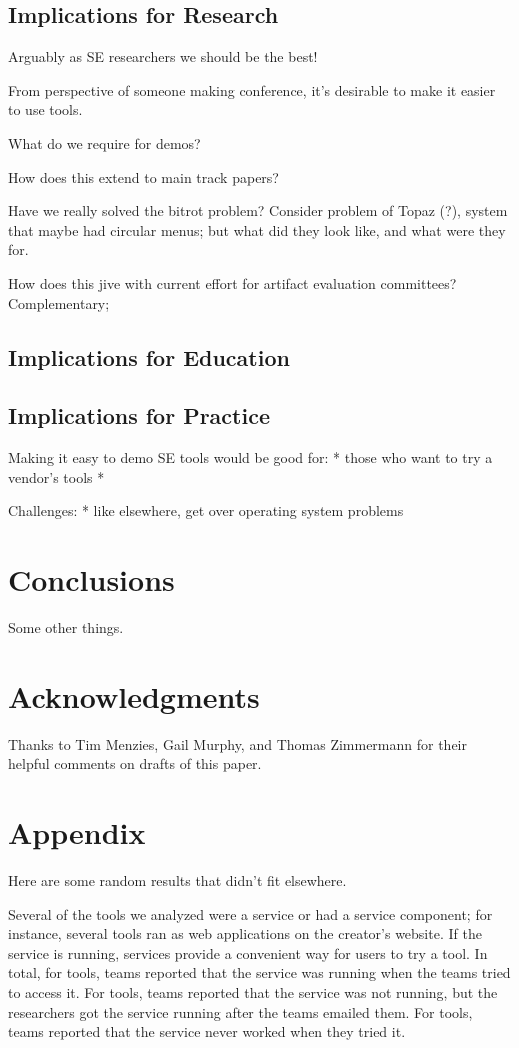 \documentclass[10pt,conference]{IEEEtran}
\begin{document}
\subsection{Implications for Research}

Arguably as SE researchers we should be the best!

From perspective of someone making conference, it's 
desirable to make it easier to use tools.

What do we require for demos?

How does this extend to main track papers?

Have we really solved the bitrot problem?
Consider problem of Topaz (?), system that
maybe had circular menus; but what did they
look like, and what were they for.

How does this jive with current effort for artifact
evaluation committees?
Complementary; 

\subsection{Implications for Education}

\subsection{Implications for Practice}

Making it easy to demo SE tools would be good for:
* those who want to try a vendor's tools
*  

Challenges:
* like elsewhere, get over operating system problems

\section{Conclusions}

Some other things.

\section*{Acknowledgments}

Thanks to Tim Menzies, Gail Murphy, and Thomas Zimmermann
for their helpful comments on drafts of this paper.  





\section{Appendix}

Here are some random results that didn't fit elsewhere.

Several of the tools we analyzed were a service or had a
service component; for instance, several tools
ran as web applications on the creator's website.
If the service is running, services provide a convenient way
for users to try a tool.
In total, for \serviceRunning tools, teams 
reported that the service was running when the teams tried
to access it.
For \serviceRunningLater tools, teams reported that the service
was not running, but the researchers got the service running
after the teams emailed them.
For \serviceRunningNever tools, teams reported that the service
never worked when they tried it.  
\end{document}

